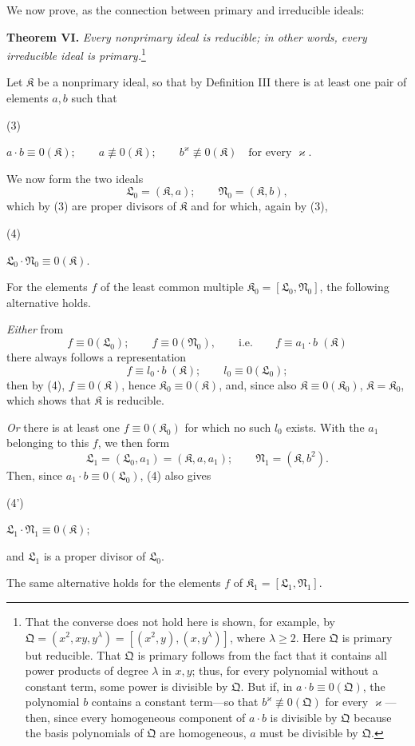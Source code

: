 \documentclass[11pt]{article}
\providecommand{\srcnumdisplay}[3][3.4em]{%
  \par\smallskip\noindent
  \begin{minipage}[t]{#1}\vspace*{0pt}#2\end{minipage}%
  \begin{minipage}[t]{\dimexpr\linewidth-#1\relax}\vspace*{0pt}\centering
  \(\displaystyle #3\)
  \end{minipage}\par\smallskip}
\providecommand{\ideal}[1]{\mathfrak{#1}}
\begin{document}
We now prove, as the connection between primary and irreducible ideals:

\textbf{Theorem VI.} \emph{Every nonprimary ideal is reducible; in other words, every irreducible ideal is primary.}\footnote{That the converse does not hold here is shown, for example, by $\ideal Q=(x^2,xy,y^\lambda)=[(x^2,y),(x,y^\lambda)]$, where $\lambda\ge2$. Here $\ideal Q$ is primary but reducible. That $\ideal Q$ is primary follows from the fact that it contains all power products of degree $\lambda$ in $x,y$; thus, for every polynomial without a constant term, some power is divisible by $\ideal Q$. But if, in $a\cdot b\equiv0(\ideal Q)$, the polynomial $b$ contains a constant term---so that $b^\varkappa\not\equiv0(\ideal Q)$ for every $\varkappa$---then, since every homogeneous component of $a\cdot b$ is divisible by $\ideal Q$ because the basis polynomials of $\ideal Q$ are homogeneous, $a$ must be divisible by $\ideal Q$.}

Let $\ideal K$ be a nonprimary ideal, so that by Definition III there is at least one pair of elements $a,b$ such that
\srcnumdisplay[3.1em]{(3)}{a\cdot b\equiv0(\ideal K);\qquad
 a\not\equiv0(\ideal K);\qquad
 b^\varkappa\not\equiv0(\ideal K)\quad\text{for every }\varkappa.}
We now form the two ideals
\[
 \ideal L_0=(\ideal K,a);\qquad \ideal N_0=(\ideal K,b),
\]
which by (3) are proper divisors of $\ideal K$ and for which, again by (3),
\srcnumdisplay[3.1em]{(4)}{\ideal L_0\cdot\ideal N_0\equiv0(\ideal K).}
For the elements $f$ of the least common multiple $\ideal K_0=[\ideal L_0,\ideal N_0]$, the following alternative holds.

\emph{Either} from
\[
 f\equiv0(\ideal L_0);\qquad f\equiv0(\ideal N_0),
 \qquad\text{i.e.}\qquad f\equiv a_1\cdot b\;(\ideal K)
\]
there always follows a representation
\[
 f\equiv l_0\cdot b\;(\ideal K);\qquad l_0\equiv0(\ideal L_0);
\]
then by (4), $f\equiv0(\ideal K)$, hence $\ideal K_0\equiv0(\ideal K)$, and, since also $\ideal K\equiv0(\ideal K_0)$, $\ideal K=\ideal K_0$, which shows that $\ideal K$ is reducible.

\emph{Or} there is at least one $f\equiv0(\ideal K_0)$ for which no such $l_0$ exists. With the $a_1$ belonging to this $f$, we then form
\[
 \ideal L_1=(\ideal L_0,a_1)=(\ideal K,a,a_1);\qquad
 \ideal N_1=(\ideal K,b^2).
\]
Then, since $a_1\cdot b\equiv0(\ideal L_0)$, (4) also gives
\srcnumdisplay[3.1em]{(4')}{\ideal L_1\cdot\ideal N_1\equiv0(\ideal K);}
and $\ideal L_1$ is a proper divisor of $\ideal L_0$.

The same alternative holds for the elements $f$ of $\ideal K_1=[\ideal L_1,\ideal N_1]$.
\end{document}
